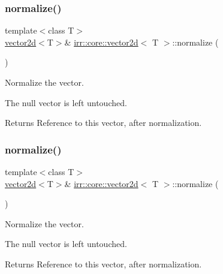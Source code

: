 \subsubsection{\texorpdfstring{normalize()}{normalize()}\hspace{0.1cm}{\footnotesize\ttfamily [1/2]}}
{\footnotesize\ttfamily template$<$class T$>$ \\
\hyperlink{classirr_1_1core_1_1vector2d}{vector2d}$<$T$>$\& \hyperlink{classirr_1_1core_1_1vector2d}{irr\+::core\+::vector2d}$<$ T $>$\+::normalize (\begin{DoxyParamCaption}{ }\end{DoxyParamCaption})\hspace{0.3cm}{\ttfamily [inline]}}



Normalize the vector. 

The null vector is left untouched. \begin{DoxyReturn}{Returns}
Reference to this vector, after normalization. 
\end{DoxyReturn}
\mbox{\label{classirr_1_1core_1_1vector2d_a5d5c360ed4c4fd28d4a42272634b8e55}} 
\subsubsection{\texorpdfstring{normalize()}{normalize()}\hspace{0.1cm}{\footnotesize\ttfamily [2/2]}}
{\footnotesize\ttfamily template$<$class T$>$ \\
\hyperlink{classirr_1_1core_1_1vector2d}{vector2d}$<$T$>$\& \hyperlink{classirr_1_1core_1_1vector2d}{irr\+::core\+::vector2d}$<$ T $>$\+::normalize (\begin{DoxyParamCaption}{ }\end{DoxyParamCaption})\hspace{0.3cm}{\ttfamily [inline]}}



Normalize the vector. 

The null vector is left untouched. \begin{DoxyReturn}{Returns}
Reference to this vector, after normalization. 
\end{DoxyReturn}
\mbox{\label{classirr_1_1core_1_1vector2d_ac9c77997f6594d79d5daa5f6bf690ed2}} 
